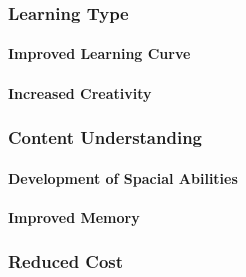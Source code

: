 \subsubsection{Learning Type}
\paragraph{Improved Learning Curve}
\paragraph{Increased Creativity}
\subsubsection{Content Understanding}
\paragraph{Development of Spacial Abilities}
\paragraph{Improved Memory}
\subsubsection{Reduced Cost}